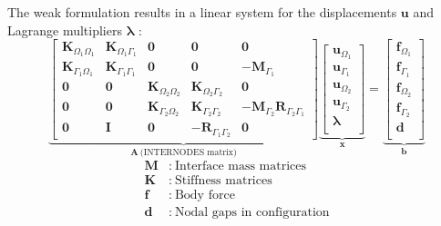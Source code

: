 \documentclass[11pt, a4paper]{article}
\begin{document}
The weak formulation results in a linear system for the displacements $\mathbf{u}$ and Lagrange multipliers $\boldsymbol{\lambda}$ \cite{voet}:
\begin{equation}
\underbrace{
\begin{bmatrix}
    \mathbf{K}_{\Omega_1\Omega_1} & \mathbf{K}_{\Omega_1\Gamma_1} & \boldsymbol{0} & \boldsymbol{0} & \boldsymbol{0} \\
    \mathbf{K}_{\Gamma_1\Omega_1} & \mathbf{K}_{\Gamma_1\Gamma_1} & \boldsymbol{0} & \boldsymbol{0} & - \mathbf{M}_{\Gamma_1} \\
    \boldsymbol{0} & \boldsymbol{0} & \mathbf{K}_{\Omega_2\Omega_2} & \mathbf{K}_{\Omega_2\Gamma_2} & \boldsymbol{0} \\
    \boldsymbol{0} & \boldsymbol{0} & \mathbf{K}_{\Gamma_2\Omega_2} & \mathbf{K}_{\Gamma_2\Gamma_2} & -\mathbf{M}_{\Gamma_2} \mathbf{R}_{\Gamma_2 \Gamma_1} \\
    \boldsymbol{0} & \boldsymbol{I} & \boldsymbol{0} & -\mathbf{R}_{\Gamma_1 \Gamma_2} & \boldsymbol{0}   
\end{bmatrix}
}_{\mathbf{A}~\text{(INTERNODES matrix)}}
\underbrace{
\begin{bmatrix}
    \mathbf{u}_{\Omega_1} \\
    \mathbf{u}_{\Gamma_1} \\
    \mathbf{u}_{\Omega_2} \\
    \mathbf{u}_{\Gamma_2} \\
    \boldsymbol{\lambda} \\
\end{bmatrix}
}_{\mathbf{x}}
= 
\underbrace{
\begin{bmatrix}
    \mathbf{f}_{\Omega_1} \\
    \mathbf{f}_{\Gamma_1} \\
    \mathbf{f}_{\Omega_2} \\
    \mathbf{f}_{\Gamma_2} \\
    \mathbf{d} \\
\end{bmatrix}
}_{\mathbf{b}}
\label{equ:linear-system}
\end{equation}
\begin{align}
    \mathbf{M} &:~ \text{Interface mass matrices} \\
    \mathbf{K} &:~ \text{Stiffness matrices} \\
    \mathbf{f} &:~ \text{Body force} \\
    \mathbf{d} &:~ \text{Nodal gaps in configuration}
\end{align}
\end{document}
